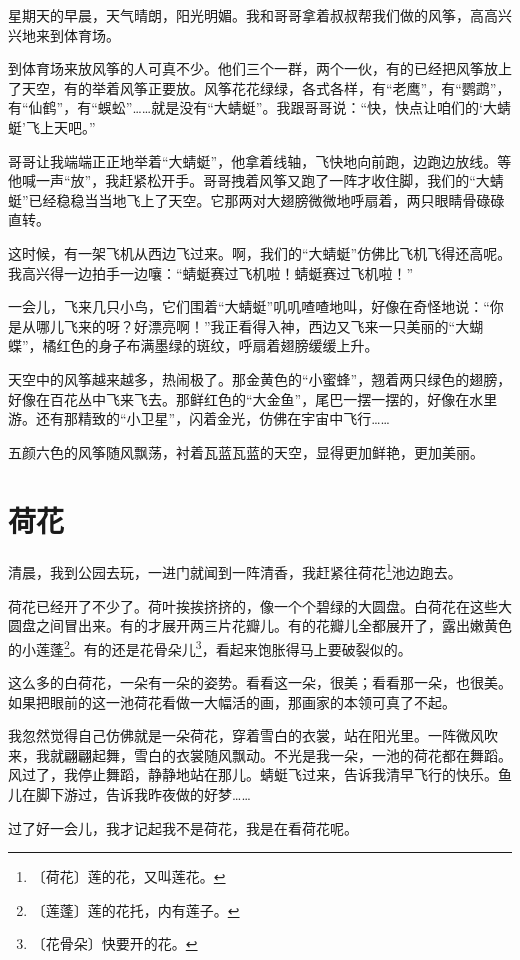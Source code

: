 \documentclass[12pt,UTF-8,openany]{ctexbook}
\begin{document}
\begin{Large}
    
    星期天的早晨，天气晴朗，阳光明媚。我和哥哥拿着叔叔帮我们做的风筝，高高兴兴地来到体育场。
    
    到体育场来放风筝的人可真不少。他们三个一群，两个一伙，有的已经把风筝放上了天空，有的举着风筝正要放。风筝花花绿绿，各式各样，有“老鹰”，有“鹦鹉”，有“仙鹤”，有“蜈蚣”……就是没有“大蜻蜓”。我跟哥哥说：“快，快点让咱们的‘大蜻蜓’飞上天吧。”
    
    哥哥让我端端正正地举着“大蜻蜓”，他拿着线轴，飞快地向前跑，边跑边放线。等他喊一声“放”，我赶紧松开手。哥哥拽着风筝又跑了一阵才收住脚，我们的“大蜻蜓”已经稳稳当当地飞上了天空。它那两对大翅膀微微地呼扇着，两只眼睛骨碌碌直转。
    
    这时候，有一架飞机从西边飞过来。啊，我们的“大蜻蜓”仿佛比飞机飞得还高呢。我高兴得一边拍手一边嚷：“蜻蜓赛过飞机啦！蜻蜓赛过飞机啦！”
    
    一会儿，飞来几只小鸟，它们围着“大蜻蜓”叽叽喳喳地叫，好像在奇怪地说：“你是从哪儿飞来的呀？好漂亮啊！”我正看得入神，西边又飞来一只美丽的“大蝴蝶”，橘红色的身子布满墨绿的斑纹，呼扇着翅膀缓缓上升。
    
    天空中的风筝越来越多，热闹极了。那金黄色的“小蜜蜂”，翘着两只绿色的翅膀，好像在百花丛中飞来飞去。那鲜红色的“大金鱼”，尾巴一摆一摆的，好像在水里游。还有那精致的“小卫星”，闪着金光，仿佛在宇宙中飞行……
    
    五颜六色的风筝随风飘荡，衬着瓦蓝瓦蓝的天空，显得更加鲜艳，更加美丽。
    
\end{Large}

\chapter{荷花}

\begin{Large}
    
    清晨，我到公园去玩，一进门就闻到一阵清香，我赶紧往荷花\footnote{〔荷花〕莲的花，又叫莲花。}池边跑去。
    
    荷花已经开了不少了。荷叶挨挨挤挤的，像一个个碧绿的大圆盘。白荷花在这些大圆盘之间冒出来。有的才展开两三片花瓣儿。有的花瓣儿全都展开了，露出嫩黄色的小莲蓬\footnote{〔莲蓬〕莲的花托，内有莲子。}。有的还是花骨朵儿\footnote{〔花骨朵〕快要开的花。}，看起来饱胀得马上要破裂似的。
    
    这么多的白荷花，一朵有一朵的姿势。看看这一朵，很美；看看那一朵，也很美。如果把眼前的这一池荷花看做一大幅活的画，那画家的本领可真了不起。
    
    我忽然觉得自己仿佛就是一朵荷花，穿着雪白的衣裳，站在阳光里。一阵微风吹来，我就翩翩起舞，雪白的衣裳随风飘动。不光是我一朵，一池的荷花都在舞蹈。风过了，我停止舞蹈，静静地站在那儿。蜻蜓飞过来，告诉我清早飞行的快乐。鱼儿在脚下游过，告诉我昨夜做的好梦……
    
    过了好一会儿，我才记起我不是荷花，我是在看荷花呢。
    
\end{Large}
\end{document}
